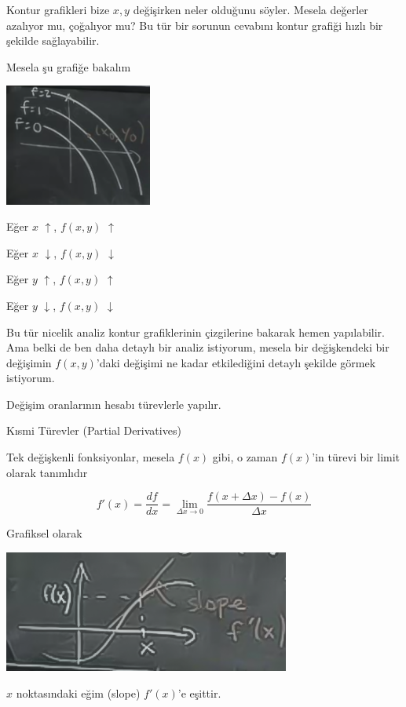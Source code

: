 \documentclass[12pt,fleqn]{article}\usepackage{../../common}
\begin{document}
Kontur grafikleri bize $x,y$ değişirken neler olduğunu söyler. Mesela değerler
azalıyor mu, çoğalıyor mu? Bu tür bir sorunun cevabını kontur grafiği hızlı bir
şekilde sağlayabilir.

Mesela şu grafiğe bakalım

\begin{center}
\includegraphics[height=4cm]{8_14.png}
\end{center}

Eğer $x$ $\uparrow$, $f(x,y)$ $\uparrow$

Eğer $x$ $\downarrow$, $f(x,y)$ $\downarrow$

Eğer $y$ $\uparrow$, $f(x,y)$ $\uparrow$

Eğer $y$ $\downarrow$, $f(x,y)$ $\downarrow$

Bu tür nicelik analiz kontur grafiklerinin çizgilerine bakarak hemen
yapılabilir. Ama belki de ben daha detaylı bir analiz istiyorum, mesela bir
değişkendeki bir değişimin $f(x,y)$'daki değişimi ne kadar etkilediğini detaylı
şekilde görmek istiyorum.

Değişim oranlarının hesabı türevlerle yapılır. 

Kısmi Türevler (Partial Derivatives)

Tek değişkenli fonksiyonlar, mesela $f(x)$ gibi, o zaman $f(x)$'in türevi
bir limit olarak tanımlıdır

$$ f'(x) = \frac{df}{dx}  = 
\lim_{\Delta x \to 0} \frac{f(x+\Delta x) - f(x)}{\Delta x}
$$

Grafiksel olarak
\begin{center}
\includegraphics[height=4cm]{8_15.png}
\end{center}
$x$ noktasındaki eğim (slope) $f'(x)$'e eşittir. 
\end{document}
